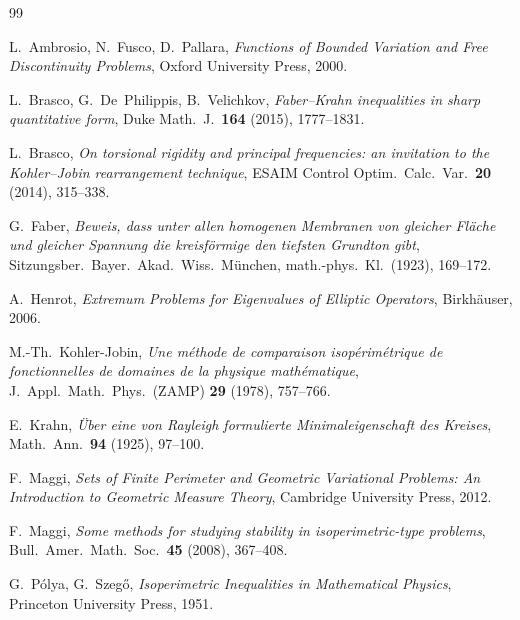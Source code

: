 \iffalse
\begin{thebibliography}{99}

L.~Ambrosio, N.~Fusco, D.~Pallara,
\emph{Functions of Bounded Variation and Free Discontinuity
Problems}, Oxford University Press, 2000.

L.~Brasco, G.~De~Philippis, B.~Velichkov,
\emph{Faber--Krahn inequalities in sharp quantitative form},
Duke Math.\ J.\ \textbf{164} (2015), 1777--1831.

L.~Brasco,
\emph{On torsional rigidity and principal frequencies: an invitation
to the Kohler--Jobin rearrangement technique}, ESAIM Control Optim.\
Calc.\ Var.\ \textbf{20} (2014), 315--338.

G.~Faber, \emph{Beweis, dass unter allen homogenen Membranen von
gleicher Fl\"ache und gleicher Spannung die kreisf\"ormige den
tiefsten Grundton gibt}, Sitzungsber.\ Bayer.\ Akad.\ Wiss.\
M\"unchen, math.-phys.\ Kl.\ (1923), 169--172.

A.~Henrot, \emph{Extremum Problems for Eigenvalues of Elliptic
Operators}, Birkh\"auser, 2006.

M.-Th.~Kohler-Jobin,
\emph{Une m\'ethode de comparaison isop\'erim\'etrique de fonctionnelles
de domaines de la physique math\'ematique},
J.\ Appl.\ Math.\ Phys.\ (ZAMP) \textbf{29} (1978), 757--766.

E.~Krahn, \emph{\"Uber eine von Rayleigh formulierte
Minimaleigenschaft des Kreises}, Math.\ Ann.\ \textbf{94} (1925),
97--100.

F.~Maggi, \emph{Sets of Finite Perimeter and Geometric Variational
Problems: An Introduction to Geometric Measure Theory}, Cambridge
University Press, 2012.

F.~Maggi, \emph{Some methods for studying stability in
isoperimetric-type problems}, Bull.\ Amer.\ Math.\ Soc.\
\textbf{45} (2008), 367--408.

\bibitem{PolyaSzego1951}
G.~P\'olya, G.~Szeg\H{o}, \emph{Isoperimetric Inequalities in
Mathematical Physics}, Princeton University Press, 1951.


\end{thebibliography}
